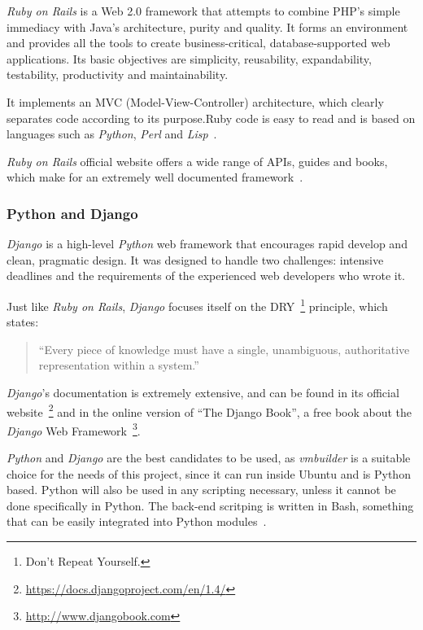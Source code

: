 \textit{Ruby on Rails} is a Web 2.0 framework that attempts to combine PHP’s simple immediacy with Java’s architecture, purity and quality. It forms an environment and provides all the tools to create business-critical, database-supported web applications. Its basic objectives are simplicity, reusability, expandability, testability, productivity and maintainability.

It implements an MVC (Model-View-Controller) architecture, which clearly separates code according to its purpose.Ruby code is easy to read and is based on languages such as \textit{Python}, \textit{Perl} and \textit{Lisp}~\cite{ror}.

\textit{Ruby on Rails} official website offers a wide range of APIs, guides and books, which make for an extremely well documented framework~\cite{rubyonrails}.

\subsubsection{Python and Django}\label{python}

\textit{Django} is a high-level \textit{Python} web framework that encourages rapid develop and clean, pragmatic design. It was designed to handle two challenges: intensive deadlines and the requirements of the experienced web developers who wrote it.

Just like \textit{Ruby on Rails}, \textit{Django} focuses itself on the DRY~\footnote{Don't Repeat Yourself.} principle, which states:
\begin{quote}
``Every piece of knowledge must have a single, unambiguous, authoritative representation within a system.''~\cite{c2}
\end{quote}
\textit{Django}’s documentation is extremely extensive, and can be found in its official website~\footnote{\url{https://docs.djangoproject.com/en/1.4/}} and in the online version of ``The Django Book'', a free book about the \textit{Django} Web Framework~\footnote{\url{http://www.djangobook.com}}.

\textit{Python} and \textit{Django} are the best candidates to be used, as \textit{vmbuilder} is a suitable choice for the needs of this project, since it can run inside Ubuntu and is Python based. Python will also be used in any scripting necessary, unless it cannot be done specifically in
Python. The back-end scritping is written in Bash, something that can be easily integrated into Python modules~\cite{stackoverflow-python-bash}.

